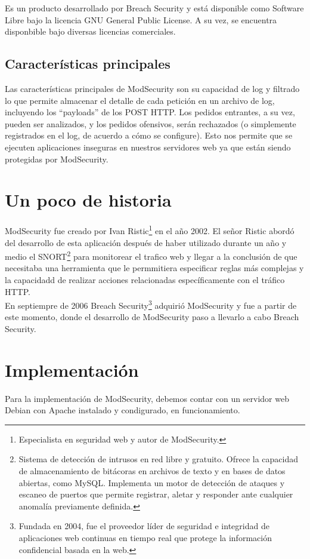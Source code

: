 \documentclass[12pt,letterpaper]{article}
\begin{document}
Es un producto desarrollado por Breach Security y está disponible como Software Libre bajo la licencia GNU General Public License. A su vez, se encuentra disponbible bajo diversas licencias comerciales.

\subsection{Características principales}
Las características principales de ModSecurity son su capacidad de log y filtrado lo que permite almacenar el detalle de cada petición en un archivo de log, incluyendo los ``payloads'' de los POST HTTP. Los pedidos entrantes, a su vez, pueden ser analizados, y los pedidos ofensivos, serán rechazados (o simplemente registrados en el log, de acuerdo a cómo se configure). Esto nos permite que se ejecuten aplicaciones inseguras en nuestros servidores web ya que están siendo protegidas por ModSecurity.


\section{Un poco de historia}
ModSecurity fue creado por Ivan Ristic\footnote{Especialista en seguridad web y autor de ModSecurity.} en el año 2002. El señor Ristic abordó del desarrollo de esta aplicación después de haber utilizado durante un año y medio el SNORT\footnote{Sistema de detección de intrusos en red libre y gratuito. Ofrece la capacidad de almacenamiento de bitácoras en archivos de texto y en bases de datos abiertas, como MySQL. Implementa un motor de detección de ataques y escaneo de puertos que permite registrar, aletar y responder ante cualquier anomalía previamente definida.} para monitorear el trafico web y llegar a la conclusión de que necesitaba una herramienta que le permmitiera especificar reglas más complejas y la capacidadd de realizar acciones relacionadas específicamente con el tráfico HTTP.\\

En septiempre de 2006 Breach Security\footnote{Fundada en 2004, fue el proveedor líder de seguridad e integridad de aplicaciones web continuas en tiempo real que protege la información confidencial basada en la web.} adquirió ModSecurity y fue a partir de este momento, donde el desarrollo de ModSecurity paso a llevarlo a cabo Breach Security.

\section{Implementación}
Para la implementación de ModSecurity, debemos contar con un servidor web Debian con Apache instalado y condigurado, en funcionamiento.
\end{document}
